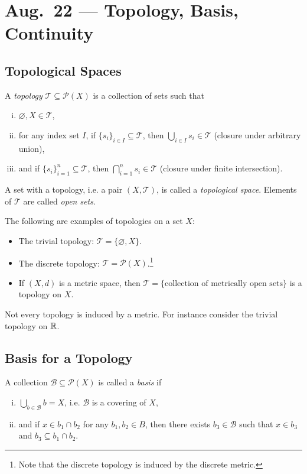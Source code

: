 \chapter{Aug.~22 --- Topology, Basis, Continuity}

\section{Topological Spaces}
\begin{definition}
  A \emph{topology} $\mathcal{T} \subseteq \mathcal{P}(X)$ is a
  collection of sets such that
  \begin{enumerate}[(i)]
    \item $\varnothing, X \in \mathcal{T}$,
    \item for any index set $I$, if $\{s_i\}_{i \in I} \subseteq \mathcal{T}$,
      then $\bigcup_{i \in I} s_i \in \mathcal{T}$ (closure under arbitrary union),
    \item and if $\{s_i\}_{i = 1}^n \subseteq \mathcal{T}$, then
      $\bigcap_{i = 1}^n s_i \in \mathcal{T}$ (closure under finite intersection).
  \end{enumerate}
  A set with a topology, i.e. a pair
  $(X, \mathcal{T})$,
  is called a \emph{topological space}.
  Elements of $\mathcal{T}$ are called
  \emph{open sets}.
\end{definition}

\begin{example}
  The following are examples of topologies on a set $X$:
  \begin{itemize}
    \item The trivial topology: $\mathcal{T} = \{\varnothing, X\}$.
    \item The discrete topology: $\mathcal{T} = \mathcal{P}(X)$.\footnote{Note that the discrete topology is induced by the discrete metric.}
    \item If $(X, d)$ is a metric space, then
      $\mathcal{T} = \{\text{collection of metrically open sets}\}$
      is a topology on $X$.
  \end{itemize}
\end{example}

\begin{remark}
  Not every topology is induced by a metric.
  For instance consider the trivial topology
  on $\mathbb{R}$.
\end{remark}

\section{Basis for a Topology}
\begin{definition}
  A collection $\mathcal{B} \subseteq \mathcal{P}(X)$
  is called a \emph{basis} if
  \begin{enumerate}[(i)]
    \item $\bigcup_{b \in \mathcal{B}} b = X$, i.e.
      $\mathcal{B}$ is a covering of $X$,
    \item and if $x \in b_1 \cap b_2$ for any
      $b_1, b_2 \in B$, then there exists $b_3 \in \mathcal{B}$
      such that $x \in b_3$
      and $b_3 \subseteq b_1 \cap b_2$.
  \end{enumerate}
\end{definition}

